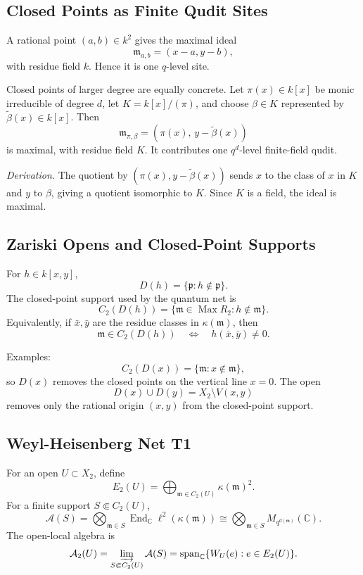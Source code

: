 \subsection{Closed Points as Finite Qudit Sites}

A rational point \((a,b)\in k^2\) gives the maximal ideal
\[
  \mathfrak m_{a,b}=(x-a,y-b),
\]
with residue field \(k\).  Hence it is one \(q\)-level site.

Closed points of larger degree are equally concrete.  Let \(\pi(x)\in k[x]\)
be monic irreducible of degree \(d\), let \(K=k[x]/(\pi)\), and choose
\(\beta\in K\) represented by \(\widetilde\beta(x)\in k[x]\).  Then
\[
  \mathfrak m_{\pi,\beta}=(\pi(x),\,y-\widetilde\beta(x))
\]
is maximal, with residue field \(K\).  It contributes one \(q^d\)-level
finite-field qudit.

\emph{Derivation.}
The quotient by \((\pi(x),y-\widetilde\beta(x))\) sends \(x\) to the class of
\(x\) in \(K\) and \(y\) to \(\beta\), giving a quotient isomorphic to \(K\).
Since \(K\) is a field, the ideal is maximal.

\subsection{Zariski Opens and Closed-Point Supports}

For \(h\in k[x,y]\),
\[
  D(h)=\{\mathfrak p:h\notin\mathfrak p\}.
\]
The closed-point support used by the quantum net is
\[
  C_2(D(h))=
  \{\mathfrak m\in\operatorname{Max}R_2:h\notin\mathfrak m\}.
\]
Equivalently, if \(\bar x,\bar y\) are the residue classes in
\(\kappa(\mathfrak m)\), then
\[
  \mathfrak m\in C_2(D(h))
  \quad\Longleftrightarrow\quad
  h(\bar x,\bar y)\ne0.
\]

Examples:
\[
  C_2(D(x))=\{\mathfrak m:x\notin\mathfrak m\},
\]
so \(D(x)\) removes the closed points on the vertical line \(x=0\).  The open
\[
  D(x)\cup D(y)=X_2\setminus V(x,y)
\]
removes only the rational origin \((x,y)\) from the closed-point support.

\subsection{Weyl-Heisenberg Net T1}

For an open \(U\subset X_2\), define
\[
  E_2(U)=\bigoplus_{\mathfrak m\in C_2(U)}\kappa(\mathfrak m)^2.
\]
For a finite support \(S\Subset C_2(U)\),
\[
  \mathcal A(S)=
  \bigotimes_{\mathfrak m\in S}
  \operatorname{End}_{\mathbb C}\ell^2(\kappa(\mathfrak m))
  \cong
  \bigotimes_{\mathfrak m\in S}M_{q^{d(\mathfrak m)}}(\mathbb C).
\]
The open-local algebra is
\[
  \mathcal A_2(U)=
  \varinjlim_{S\Subset C_2(U)}\mathcal A(S)
  =
  \operatorname{span}_{\mathbb C}\{W_U(e):e\in E_2(U)\}.
\]

